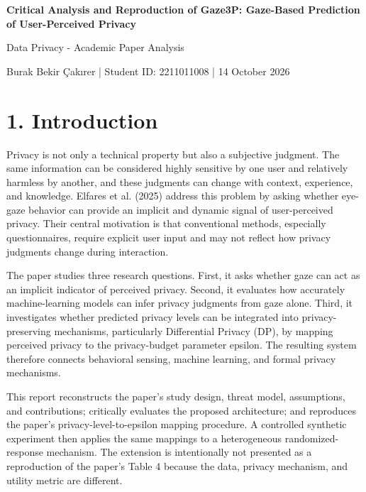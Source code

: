 \documentclass[11pt,a4paper]{article}
\begin{document}
\begin{center}{\LARGE\bfseries Critical Analysis and Reproduction of Gaze3P: Gaze-Based Prediction of User-Perceived Privacy}\end{center}

\begin{center}{\large Data Privacy - Academic Paper Analysis}\end{center}
\begin{center}Burak Bekir Çakırer  |  Student ID: 2211011008  |  14 October 2026\end{center}\vspace{1em}
\section*{1. Introduction}

Privacy is not only a technical property but also a subjective judgment. The same information can be considered highly sensitive by one user and relatively harmless by another, and these judgments can change with context, experience, and knowledge. Elfares et al. (2025) address this problem by asking whether eye-gaze behavior can provide an implicit and dynamic signal of user-perceived privacy. Their central motivation is that conventional methods, especially questionnaires, require explicit user input and may not reflect how privacy judgments change during interaction.


The paper studies three research questions. First, it asks whether gaze can act as an implicit indicator of perceived privacy. Second, it evaluates how accurately machine-learning models can infer privacy judgments from gaze alone. Third, it investigates whether predicted privacy levels can be integrated into privacy-preserving mechanisms, particularly Differential Privacy (DP), by mapping perceived privacy to the privacy-budget parameter epsilon. The resulting system therefore connects behavioral sensing, machine learning, and formal privacy mechanisms.


This report reconstructs the paper's study design, threat model, assumptions, and contributions; critically evaluates the proposed architecture; and reproduces the paper's privacy-level-to-epsilon mapping procedure. A controlled synthetic experiment then applies the same mappings to a heterogeneous randomized-response mechanism. The extension is intentionally not presented as a reproduction of the paper's Table 4 because the data, privacy mechanism, and utility metric are different.
\end{document}
